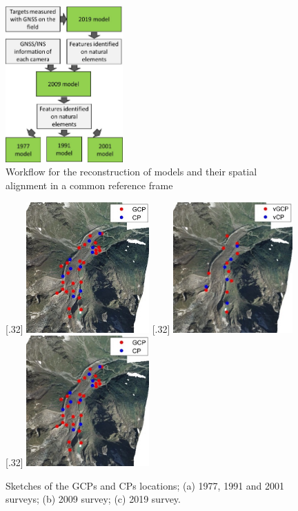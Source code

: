 \begin{figure}
    \centering
    \includegraphics[width=0.4\textwidth]{workflow}
    \caption{Workflow for the reconstruction of models and their spatial alignment in a common reference frame}
    \label{fig:2:workflow}
\end{figure}

\begin{figure}
    \centering
    \subcaptionbox{\label{fig:2:gcp:historical}}[.32\textwidth]{
        \includegraphics[height=5cm]{gcp_historical}
    } 
    \subcaptionbox{\label{fig:2:gcp:2009}}[.32\textwidth]{
        \includegraphics[height=5cm]{gcp_2009}
    }
    \subcaptionbox{\label{fig:2:gcp:2019}}[.32\textwidth]{
        \includegraphics[height=5cm]{gcp_2019}
    } 
    \caption{Sketches of the GCPs and CPs locations; (a) 1977, 1991 and 2001 surveys; (b) 2009 survey; (c) 2019 survey.}
    \label{fig:2:gcp}
\end{figure}

